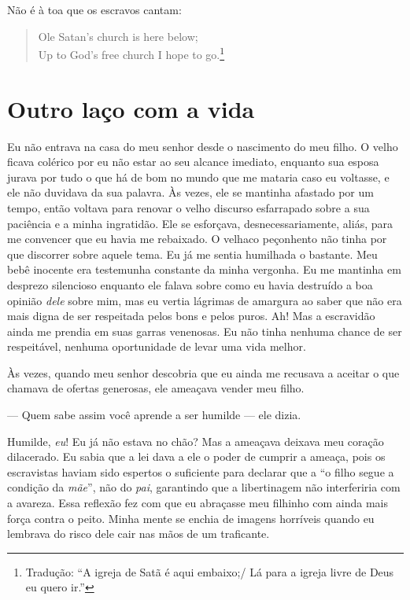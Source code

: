 Não é à toa que os escravos cantam:

\begin{verse}
Ole Satan's church is here below;\\
Up to God's free church I hope to go.\footnote{Tradução: ``A igreja de Satã
é aqui embaixo;/ Lá para a igreja livre de Deus eu quero ir.''}
\end{verse}

\chapter*{Outro laço com a vida}

Eu não entrava na casa do meu senhor
desde o nascimento do meu filho. O velho ficava colérico por eu não
estar ao seu alcance imediato, enquanto sua esposa jurava por tudo o que
há de bom no mundo que me mataria caso eu voltasse, e ele não duvidava
da sua palavra. Às vezes, ele se mantinha afastado por um tempo, então
voltava para renovar o velho discurso esfarrapado sobre a sua paciência
e a minha ingratidão. Ele se esforçava, desnecessariamente, aliás, para
me convencer que eu havia me rebaixado. O velhaco peçonhento não tinha
por que discorrer sobre aquele tema. Eu já me sentia humilhada o
bastante. Meu bebê inocente era testemunha constante da minha vergonha.
Eu me mantinha em desprezo silencioso enquanto ele falava sobre como eu
havia destruído a boa opinião \emph{dele} sobre mim, mas eu vertia
lágrimas de amargura ao saber que não era mais digna de ser respeitada
pelos bons e pelos puros. Ah! Mas a escravidão ainda me prendia em suas
garras venenosas. Eu não tinha nenhuma chance de ser respeitável,
nenhuma oportunidade de levar uma vida melhor.

Às vezes, quando meu senhor descobria
que eu ainda me recusava a aceitar o que chamava de ofertas generosas,
ele ameaçava vender meu filho.

--- Quem sabe assim você aprende a ser humilde --- ele dizia.

Humilde, \emph{eu}! Eu já não estava no
chão? Mas a ameaçava deixava meu coração dilacerado. Eu sabia que a lei
dava a ele o poder de cumprir a ameaça, pois os escravistas haviam sido
espertos o suficiente para declarar que a ``o filho segue a condição da
\emph{mãe}'', não do \emph{pai}, garantindo que a libertinagem não
interferiria com a avareza. Essa reflexão fez com que eu abraçasse meu
filhinho com ainda mais força contra o peito. Minha mente se enchia de
imagens horríveis quando eu lembrava do risco dele cair nas mãos de um
traficante.

